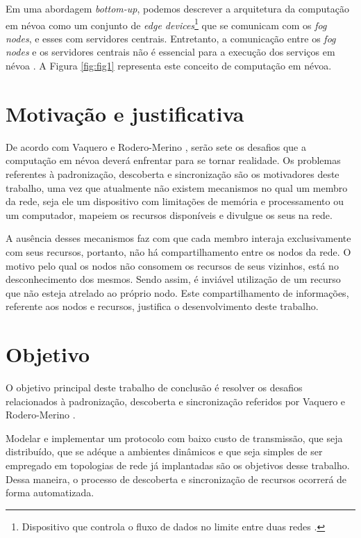 Em uma abordagem \textit{bottom-up}, podemos descrever a arquitetura da computação em névoa como um conjunto de \textit{edge devices}\footnote{Dispositivo que controla o fluxo de dados no limite entre duas redes \cite{edgeDevices}.} que se comunicam com os \textit{fog nodes}, e esses com servidores centrais.
Entretanto, a comunicação entre os \textit{fog nodes} e os servidores centrais não é essencial para a execução dos serviços em névoa \cite{DBLP:journals/corr/RomanLM16}.
A Figura \ref{fig:fig1} representa este conceito de computação em névoa.

\section{Motivação e justificativa}

De acordo com Vaquero e Rodero-Merino \cite{Vaquero:2014}, serão sete os desafios que a computação em névoa deverá enfrentar para se tornar realidade.
Os problemas referentes à padronização, descoberta e sincronização são os motivadores deste trabalho, uma vez que atualmente não existem mecanismos
no qual um membro da rede, seja ele um dispositivo com limitações de memória e processamento ou um computador, mapeiem os recursos disponíveis e divulgue os seus na rede.

A ausência desses mecanismos faz com que cada membro interaja exclusivamente com seus recursos, portanto, não há compartilhamento entre os nodos da rede.
O motivo pelo qual os nodos não consomem os recursos de seus vizinhos, está no desconhecimento dos mesmos. Sendo assim, é inviável utilização de um recurso que não esteja atrelado ao próprio nodo.
Este compartilhamento de informações, referente aos nodos e recursos, justifica o desenvolvimento deste trabalho.


\section{Objetivo}

O objetivo principal deste trabalho de conclusão é resolver os desafios relacionados à padronização, descoberta e sincronização referidos por Vaquero e Rodero-Merino \cite{Vaquero:2014}.

Modelar e implementar um protocolo com baixo custo de transmissão, que seja distribuído, que se adéque a ambientes dinâmicos e que seja simples de ser
empregado em topologias de rede já implantadas são os objetivos desse trabalho. Dessa maneira, o processo de descoberta e sincronização de recursos ocorrerá de forma automatizada.
